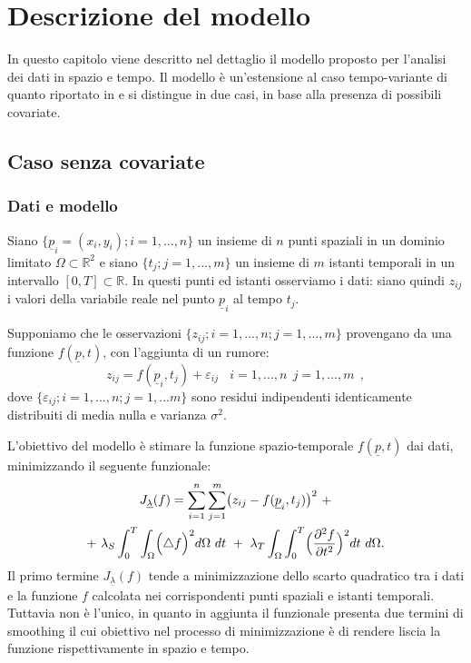 \documentclass[a4paper,11pt,twoside,openright]{book}							%
\begin{document}
\chapter{Descrizione del modello}

In questo capitolo viene descritto nel dettaglio il modello proposto per l'analisi dei dati in spazio e tempo. Il modello è un'estensione al caso tempo-variante di quanto riportato in \cite{art:sangalli} e si distingue in due casi, in base alla presenza di possibili covariate.


\section{Caso senza covariate}

\subsection*{Dati e modello}

Siano $\{\underline p_i = (x_i,y_i); i=1, ... , n\}$ un insieme di $n$ punti spaziali in un dominio limitato $\Omega \subset \mathbb R^2$ e siano $\{t_j ; j=1, ... , m\}$ un insieme di $m$ istanti temporali in un intervallo $[0,T]\subset \mathbb R$. In questi punti ed istanti osserviamo i dati: siano quindi $z_{ij}$ i valori della variabile reale nel punto $\underline p_i$ al tempo $t_j$.

Supponiamo che le osservazioni $\{ z_{ij};i=1, ... , n; j=1, ... , m \}$ provengano da una funzione $f(\underline p, t)$, con l'aggiunta di un rumore:
\begin{equation}
\label{eq:modellobase}
z_{ij}=f(\underline p_i,t_j)+\varepsilon_{ij}\ \ \ \ i = 1,...,n\ \ j=1,...,m \ \ ,
\end{equation}
dove $\{\varepsilon_{ij}; i = 1,...,n; j=1,...m\}$ sono residui indipendenti identicamente distribuiti di media nulla e varianza $\sigma^2$.

L'obiettivo del modello è stimare la funzione spazio-temporale $f(\underline p, t)$ dai dati, minimizzando il seguente funzionale:
\begin{multline}
\label{eq:Jfunc}
J_{\underline \lambda }(f) = \sum_{i=1}^n \sum_{j=1}^m \bigl( z_{ij} - f(\underline p_i,t_j) \bigr)^2 \ + \\+\   \lambda_S \int_0^T \int_\Omega \Bigl( \triangle f  \Bigr)^2 d\Omega\ dt \ +\  \lambda_T \int_\Omega \int_0^T \Bigl( \frac{\partial^2 f }{\partial t ^2} \Bigr)^2 dt\ d\Omega .
\end{multline}
Il primo termine $J_{\underline \lambda }(f)$ tende a minimizzazione dello scarto quadratico tra i dati e la funzione $f$ calcolata nei corrispondenti punti spaziali e istanti temporali. Tuttavia non è l'unico, in quanto in aggiunta il funzionale presenta due termini di smoothing il cui obiettivo nel processo di minimizzazione è di rendere liscia la funzione rispettivamente in spazio e tempo.
\end{document}
